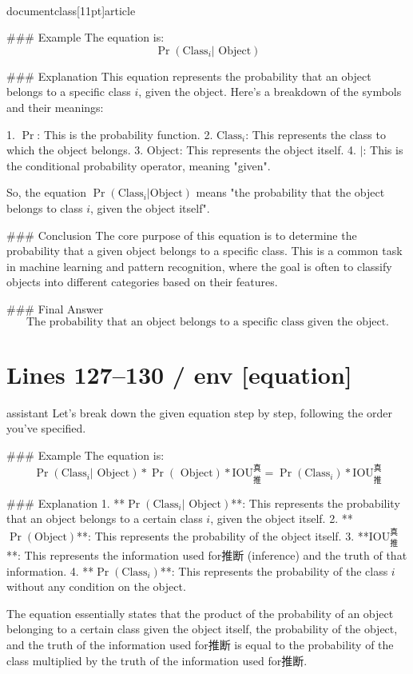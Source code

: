 \\documentclass[11pt]{article}
\begin{document}
### Example
The equation is:
\[
\Pr(\textrm{Class}_i | \textrm{ Object})
\]

### Explanation
This equation represents the probability that an object belongs to a specific class \(i\), given the object. Here's a breakdown of the symbols and their meanings:

1. \(\Pr\): This is the probability function.
2. \(\textrm{Class}_i\): This represents the class to which the object belongs.
3. \(\textrm{Object}\): This represents the object itself.
4. \(|\): This is the conditional probability operator, meaning "given".

So, the equation \(\Pr(\textrm{Class}_i | \textrm{Object})\) means "the probability that the object belongs to class \(i\), given the object itself".

### Conclusion
The core purpose of this equation is to determine the probability that a given object belongs to a specific class. This is a common task in machine learning and pattern recognition, where the goal is often to classify objects into different categories based on their features.

### Final Answer
\[
\boxed{\text{The probability that an object belongs to a specific class given the object.}}
\]


\section*{Lines 127–130 / env [equation]}
assistant
Let's break down the given equation step by step, following the order you've specified.

### Example
The equation is:
\[
\Pr(\textrm{Class}_i | \textrm{ Object}) * \Pr(\textrm{ Object}) * \textrm{IOU}_{\textrm{推}}^{\textrm{真}} = \Pr(\textrm{Class}_i) * \textrm{IOU}_{\textrm{推}}^{\textrm{真}}
\]

### Explanation
1. **\(\Pr(\textrm{Class}_i | \textrm{ Object})\)**: This represents the probability that an object belongs to a certain class \(i\), given the object itself.
2. **\(\Pr(\textrm{Object})\)**: This represents the probability of the object itself.
3. **\(\textrm{IOU}_{\textrm{推}}^{\textrm{真}}\)**: This represents the information used for推断 (inference) and the truth of that information.
4. **\(\Pr(\textrm{Class}_i)\)**: This represents the probability of the class \(i\) without any condition on the object.

The equation essentially states that the product of the probability of an object belonging to a certain class given the object itself, the probability of the object, and the truth of the information used for推断 is equal to the probability of the class multiplied by the truth of the information used for推断.
\end{document}
